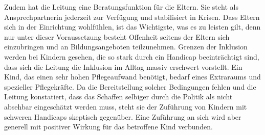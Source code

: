 Zudem hat die Leitung eine Beratungsfunktion für die Eltern. Sie steht als Ansprechpartnerin jederzeit zur Verfügung und stabilisiert in Krisen. Dass Eltern sich in der Einrichtung wohlfühlen, ist das Wichtigste, was es zu leisten gilt, denn nur unter dieser Voraussetzung besteht Offenheit seitens der Eltern sich einzubringen und an Bildungsangeboten teilzunehmen.
Grenzen der Inklusion werden bei Kindern gesehen, die so stark durch ein Handicap beeinträchtigt sind, dass sich die Leitung die Inklusion im Alltag massiv erschwert vorstellt. Ein Kind, das einen sehr hohen Pflegeaufwand benötigt, bedarf eines Extraraums und spezieller Pflegekräfte. Da die Bereitstellung solcher Bedingungen fehlen und die Leitung konstatiert, dass das Schaffen selbiger durch die Politik als nicht absehbar eingeschätzt werden muss, steht sie der Zuführung von Kindern mit schweren Handicaps skeptisch gegenüber. Eine Zuführung an sich wird aber generell mit positiver Wirkung für das betroffene Kind verbunden.

